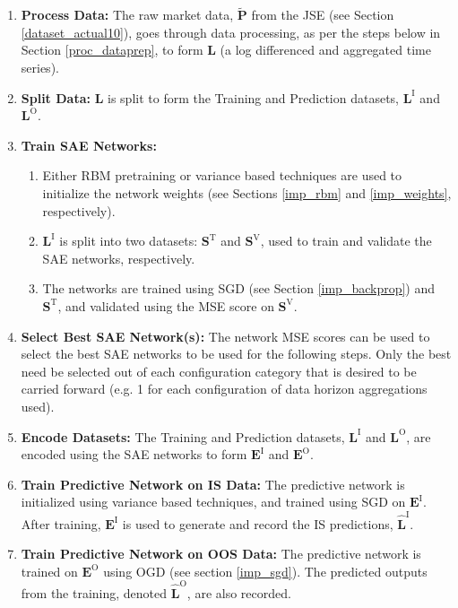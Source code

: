 \documentclass[a4paper,11pt,oneside]{article}
\theoremstyle{plain}
\theoremstyle{definition}
\begin{document}
	\begin{enumerate}
		\item \textbf{Process Data:} The raw market data, $\mathbf{\tilde{P}}$ from the JSE (see Section \ref{dataset_actual10}), goes through data processing, as per the steps below in Section \ref{proc_dataprep}, to form $\mathbf{L}$ (a log differenced and aggregated time series).
		\item \textbf{Split Data:}  $\mathbf{L}$ is split to form the Training and Prediction datasets, $\mathbf{L}^\mathrm{I}$ and $\mathbf{L}^\mathrm{O}$.
		\item \textbf{Train SAE Networks:} 
		\begin{enumerate}
			\item Either RBM pretraining or variance based techniques are used to initialize the network weights (see Sections \ref{imp_rbm} and \ref{imp_weights}, respectively).
			\item $\mathbf{L}^\mathrm{I}$ is split into two datasets: $\mathbf{S}^\mathrm{T}$ and $\mathbf{S}^\mathrm{V}$, used to train and validate the SAE networks, respectively.
			\item The networks are trained using SGD (see Section \ref{imp_backprop}) and $\mathbf{S}^\mathrm{T}$, and validated using the MSE score on $\mathbf{S}^\mathrm{V}$.
		\end{enumerate}
		\item \textbf{Select Best SAE Network(s):} The network MSE scores can be used to select the best SAE networks to be used for the following steps. Only the best need be selected out of each configuration category that is desired to be carried forward (e.g. 1 for each configuration of data horizon aggregations used).
		\item \textbf{Encode Datasets:} The Training and Prediction datasets, $\mathbf{L}^\mathrm{I}$ and $\mathbf{L}^\mathrm{O}$, are encoded using the SAE networks to form $\mathbf{E}^\mathrm{I}$ and $\mathbf{E}^\mathrm{O}$.
		\item \textbf{Train Predictive Network on IS Data:} The predictive network is initialized using variance based techniques, and trained using SGD on $\mathbf{E}^\mathrm{I}$. After training, $\mathbf{E}^\mathrm{I}$ is used to generate and record the IS predictions, $\mathbf{\hat{L}}^\mathrm{I}$.
		\item \textbf{Train Predictive Network on OOS Data:} The predictive network is trained on $\mathbf{E}^\mathrm{O}$ using OGD (see section \ref{imp_sgd}). The predicted outputs from the training, denoted $\mathbf{\hat{L}}^\mathrm{O}$, are also recorded.

\end{enumerate}
\end{document}
